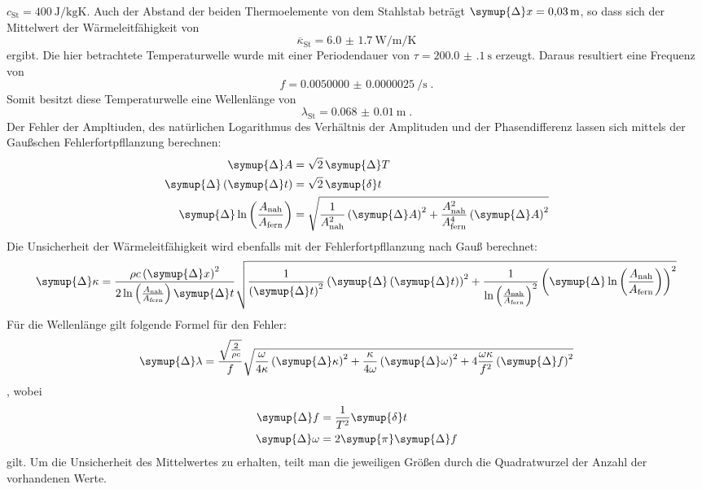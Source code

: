 $c_\text{St} = \SI{400}{\joule\per\kilogram\kelvin}$. Auch der Abstand der beiden Thermoelemente von dem Stahlstab
beträgt $\symup{\Delta} x = \SI{0.03}{\metre}$, so dass sich der Mittelwert der Wärmeleitfähigkeit von
\begin{equation}
  \overline{\kappa}_\text{St} = \SI{6.0(17)}{\watt\per\metre\per\kelvin}
\end{equation}
ergibt. Die hier betrachtete Temperaturwelle wurde mit einer Periodendauer von $\tau = \SI{200.0(1)}{\second}$ erzeugt.
Daraus resultiert eine Frequenz von 
\begin{equation}
  f = \SI{0.0050000(25)}{\per\second} \; \text{.}
\end{equation}
Somit besitzt diese Temperaturwelle eine Wellenlänge von 
\begin{equation}
  \lambda_\text{St} = \SI{0.068(10)}{\metre} \; \text{.}
\end{equation}
Der Fehler der Ampltiuden, des natürlichen Logarithmus des Verhältnis der Amplituden und der Phasendifferenz 
lassen sich mittels der Gaußschen Fehlerfortpfllanzung berechnen:
\begin{align}
  \symup{\Delta} A                                                      &= \sqrt{2} \, \symup{\Delta} T \\
  \symup{\Delta} \left (\symup{\Delta} t \right )                       &= \sqrt{2} \, \symup{\delta} t \\
  \symup{\Delta} \ln \left ( \frac{A_\text{nah}}{A_\text{fern}} \right) &= 
  \sqrt{\frac{1}{A_\text{nah}^2} \left ( \symup{\Delta} A \right )^2 + 
  \frac{A_\text{nah}^2}{A_\text{fern}^4} \left ( \symup{\Delta} A \right ) ^2} 
\end{align}
Die Unsicherheit der Wärmeleitfähigkeit wird ebenfalls mit der Fehlerfortpfllanzung nach Gauß berechnet:
\begin{equation} 
  \symup{\Delta} \kappa = \frac{\rho c \left ( \symup{\Delta} x \right )^2 }
  {2\ln \left ( \frac{A_\text{nah}}{A_\text{fern}} \right ) \symup{\Delta} t} 
  \sqrt{\frac{1}{\left( \symup{\Delta} t\right)^2}
  \left ( \symup{\Delta} \left ( \symup{\Delta} t \right ) \right )^2 + \frac{1}{ \ln \left ( \frac{A_\text{nah}}{A_\text{fern}} \right )^2}
 \left (  \symup{\Delta} \ln \left ( \frac{A_\text{nah}}{A_\text{fern}} \right ) \right )^2}
\end{equation}
Für die Wellenlänge gilt folgende Formel für den Fehler: 
\begin{equation}
 \symup{\Delta} \lambda =  \frac{\sqrt{\frac{2}{\rho c}}} {f} \sqrt{ \frac{\omega}{4 \kappa} \left ( \symup{\Delta} \kappa \right )^2 +
  \frac{\kappa}{4 \omega} \left( \symup{\Delta}\omega\right)^2 +
   4 \frac{\omega\kappa}{f^2} \left(\symup{\Delta} f\right)^2   }
\end{equation}
, wobei
\begin{align}
    \symup{\Delta}f &= \frac{1}{T^2} \symup{\delta} t \\
    \symup{\Delta}\omega &= 2 \symup{\pi} \symup{\Delta} f
\end{align}
gilt. Um die Unsicherheit des Mittelwertes zu erhalten, teilt man die jeweiligen Größen durch die Quadratwurzel der Anzahl der vorhandenen Werte.